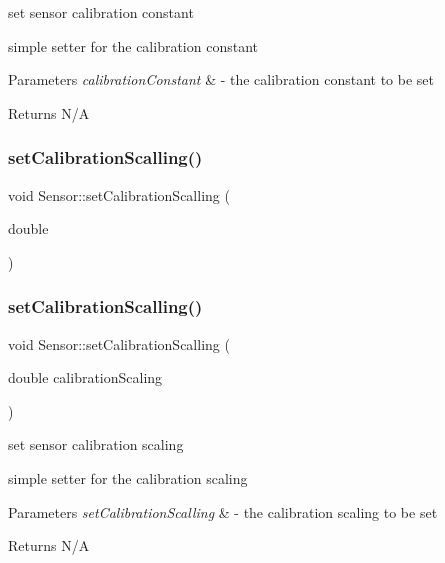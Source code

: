set sensor calibration constant 

simple setter for the calibration constant


\begin{DoxyParams}{Parameters}
{\em calibration\+Constant} & -\/ the calibration constant to be set \\
\hline
\end{DoxyParams}
\begin{DoxyReturn}{Returns}
N/A 
\end{DoxyReturn}
\mbox{\label{class_sensor_a662c899f76590071b561eab8f151fdea}} 
\subsubsection{\texorpdfstring{set\+Calibration\+Scalling()}{setCalibrationScalling()}\hspace{0.1cm}{\footnotesize\ttfamily [1/2]}}
{\footnotesize\ttfamily void Sensor\+::set\+Calibration\+Scalling (\begin{DoxyParamCaption}\item[{double}]{ }\end{DoxyParamCaption})}

\mbox{\label{class_sensor_a662c899f76590071b561eab8f151fdea}} 
\subsubsection{\texorpdfstring{set\+Calibration\+Scalling()}{setCalibrationScalling()}\hspace{0.1cm}{\footnotesize\ttfamily [2/2]}}
{\footnotesize\ttfamily void Sensor\+::set\+Calibration\+Scalling (\begin{DoxyParamCaption}\item[{double}]{calibration\+Scaling }\end{DoxyParamCaption})}



set sensor calibration scaling 

simple setter for the calibration scaling


\begin{DoxyParams}{Parameters}
{\em set\+Calibration\+Scalling} & -\/ the calibration scaling to be set \\
\hline
\end{DoxyParams}
\begin{DoxyReturn}{Returns}
N/A 
\end{DoxyReturn}
\mbox{\label{class_sensor_a1ed79291c81c8e11cdb369fd895c42cc}} 
